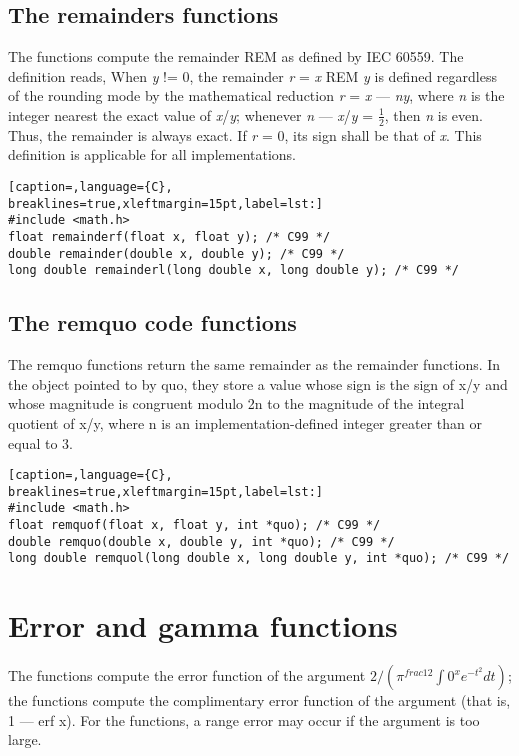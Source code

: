 \subsection{The remainders functions}
The functions compute the remainder REM as defined by IEC 60559. The definition
reads, When \emph{y} != 0, the remainder \emph{r} = \emph{x} REM \emph{y} is
defined regardless of the rounding mode by the mathematical reduction \emph{r}
= \emph{x} --- \emph{ny}, where \emph{n} is the integer nearest the exact value
of \emph{x}/\emph{y}; whenever \textbar{}\emph{n} ---
\emph{x}/\emph{y}\textbar{} = $\frac{1}{2}$, then \emph{n} is even.  Thus, the
remainder is always exact. If \emph{r} = 0, its sign shall be that of \emph{x}.
This definition is applicable for all implementations.
\lstset{basicstyle=\scriptsize, numbers=left, captionpos=b, tabsize=4}
\begin{lstlisting}[caption=,language={C},
breaklines=true,xleftmargin=15pt,label=lst:]
#include <math.h>
float remainderf(float x, float y); /* C99 */
double remainder(double x, double y); /* C99 */
long double remainderl(long double x, long double y); /* C99 */
\end{lstlisting}

\subsection{The remquo code functions}
The remquo functions return the same remainder as the remainder functions. In
the object pointed to by quo, they store a value whose sign is the sign of x/y
and whose magnitude is congruent modulo 2n to the magnitude of the integral
quotient of x/y, where n is an implementation-defined integer greater than or
equal to 3.
\lstset{basicstyle=\scriptsize, numbers=left, captionpos=b, tabsize=4}
\begin{lstlisting}[caption=,language={C},
breaklines=true,xleftmargin=15pt,label=lst:]
#include <math.h>
float remquof(float x, float y, int *quo); /* C99 */
double remquo(double x, double y, int *quo); /* C99 */
long double remquol(long double x, long double y, int *quo); /* C99 */
\end{lstlisting}

\section{Error and gamma functions}
The functions compute the error function of the argument $2/(\pi^{frac{1}{2}}
\int 0^{x} e^{-t^{2}} dt)$; the functions compute the complimentary error
function of the argument (that is, 1 --- erf x). For the functions, a range
error may occur if the argument is too large.

